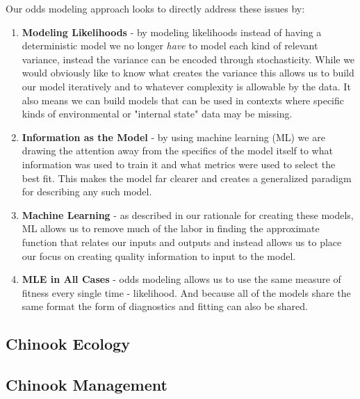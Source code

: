 \documentclass[11pt]{article}
\begin{document}
Our odds modeling approach looks to directly address these issues by:

\begin{enumerate}
\item \textbf{Modeling Likelihoods} - by modeling likelihoods instead of having a deterministic model we no longer \textit{have} to model each kind of relevant variance, instead the variance can be encoded through stochasticity. While we would obviously like to know what creates the variance this allows us to build our model iteratively and to whatever complexity is allowable by the data. It also means we can build models that can be used in contexts where specific kinds of environmental or "internal state" data may be missing.
\item \textbf{Information as the Model} - by using machine learning (ML) we are drawing the attention away from the specifics of the model itself to what information was used to train it and what metrics were used to select the best fit. This makes the model far clearer and creates a generalized paradigm for describing any such model.
\item \textbf{Machine Learning} - as described in our rationale for creating these models, ML allows us to remove much of the labor in finding the approximate function that relates our inputs and outputs and instead allows us to place our focus on creating quality information to input to the model.
\item \textbf{MLE in All Cases} - odds modeling allows us to use the same measure of fitness every single time - likelihood. And because all of the models share the same format the form of diagnostics and fitting can also be shared.
\end{enumerate}



\newpage


















\subsection{Chinook Ecology}

\subsection{Chinook Management}
\end{document}
